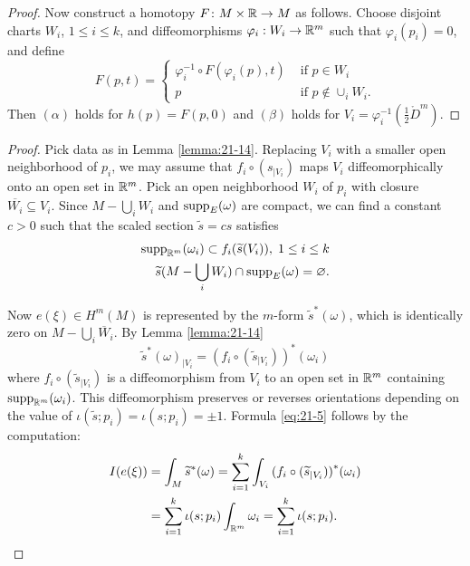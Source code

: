 \begin{proof}
  Now construct a homotopy $F\colon M \times  {\ensuremath{\mathbb{R}}} \rightarrow  M$ as follows. Choose disjoint charts $W_i$, $1 \leq  i \leq  k$, 
  and diffeomorphisms ${\varphi }_{i} : W_i \rightarrow  {{\ensuremath{\mathbb{R}}}}^{m}$ such that ${\varphi }_{i}( {p}_{i})  = 0$, and define
  \[
    F(p, t)  = 
    \left\{\begin{array}{ll} 
      {\varphi }_{i}^{-1} \circ  F( {{\varphi }_{i}( p),t}) & \text{ if }p \in  W_i \\  
      p & \text{ if }p \notin  { \cup  }_{i}W_i. 
    \end{array}\right.
  \]
  Then $( \alpha )$ holds for $h( p)  = F( {p,0})$ and $( \beta )$ holds 
  for $V_i = {\varphi }_{i}^{-1}( {\frac{1}{2}{\mathring{D}}^{m}})$.
\end{proof}


\begingroup 
\def\proofname{\textup{\bfseries Proof of Theorem \ref{theorem:21-9}}}
\begin{proof}
  Pick data as in Lemma \ref{lemma:21-14}. Replacing $V_i$ with a smaller open neighborhood of ${p}_{i}$, 
  we may assume that $f_i \circ({s}_{\mid V_i})$ maps $V_i$ diffeomorphically onto an open 
  set in ${{\mathbb{R}}}^{m}$. Pick an open neighborhood $W_i$ of ${p}_{i}$ with closure $\overline{W_i} \subseteq  V_i$. 
  Since $M-\bigcup_{i}W_i$ and ${\mathrm{supp}}_{E}( \omega )$ are compact, we can find a constant $c > 0$ 
  such that the scaled section $\widetilde{s} = {cs}$ satisfies
  \begin{align*}
    {\ensuremath{\mathrm{supp}}}_{{\mathbb{R}}^m}( {\omega }_{i}) \subset f_i( {\widetilde{s}( V_i) }),\;1 \leq  i \leq k \\
    \widetilde{s}( {M- \mathop{\bigcup }\limits_{i}W_i}) \cap {\ensuremath{\mathrm{supp}}}_{E}( \omega )  = \varnothing.
  \end{align*}

  Now $e( \xi )  \in  H^m( M)$ is represented by the $m$-form ${\widetilde{s}}^*( \omega )$, which is 
  identically zero on $M-\bigcup_i{\overline{W}}_{i}$. By Lemma \ref{lemma:21-14}
  \[
    {\widetilde{s}}^*{( \omega ) }_{\mid V_i} 
    = {( f_i \circ  ( {\widetilde{s}}_{\mid V_i}) ) }^*( {\omega }_{i})
  \]
  where $f_i \circ  ( {\widetilde{s}}_{\mid V_i})$ is a diffeomorphism from $V_i$ to an open set 
  in ${\mathbb{R}}^m$ containing ${\mathrm{supp}}_{{\mathbb{R}}^m}( {\omega }_{i})$. This diffeomorphism preserves 
  or reverses orientations depending on the value of $\iota(\widetilde{s}; p_i) =\iota(s; p_i) = \pm 1$. 
  Formula \eqref{eq:21-5} follows by the computation:
  \begin{align}\label{eq:21-7}
    \begin{aligned}
      I( {e( \xi ) }) 
      & = \int_M{\widetilde{s}}^*( \omega )  
        = \sum_{i = 1}^{k}\int_{V_i}{( f_i \circ  ( {\widetilde{s}}_{\mid V_i}) ) }^*( {\omega }_{i}) \\
      & = \sum_{i = 1}^{k}\iota ( {s;{p}_{i}}) \int_{{\mathbb{R}}^m}{\omega }_{i} 
        = \sum_{i = 1}^{k}\iota ( {s;{p}_{i}}).
    \end{aligned}  
  \end{align}
\end{proof}
\endgroup